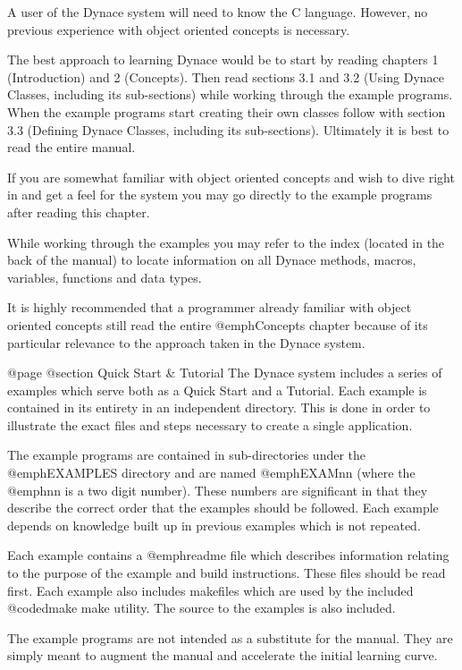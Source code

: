 A user of the Dynace system will need to know the C language.  However,
no previous experience with object oriented concepts is necessary.

The best approach to learning Dynace would be to start by reading
chapters 1 (Introduction) and 2 (Concepts).  Then read sections 3.1 and
3.2 (Using Dynace Classes, including its sub-sections) while working
through the example programs.  When the example programs start creating
their own classes follow with section 3.3 (Defining Dynace Classes,
including its sub-sections).  Ultimately it is best to read the entire
manual.

If you are somewhat familiar with object oriented concepts and wish
to dive right in and get a feel for the system you may go directly
to the example programs after reading this chapter.

While working through the examples you may refer to the index (located
in the back of the manual) to locate information on all Dynace methods,
macros, variables, functions and data types.


It is highly recommended that a programmer already familiar with object
oriented concepts still read the entire @emph{Concepts} chapter because
of its particular relevance to the approach taken in the Dynace system.







@page
@section Quick Start & Tutorial
The Dynace system includes a series of examples which serve both as a
Quick Start and a Tutorial.  Each example is contained in its entirety
in an independent directory.  This is done in order to illustrate the
exact files and steps necessary to create a single application.

The example programs are contained in sub-directories under the
@emph{EXAMPLES} directory and are named @emph{EXAMnn} (where the
@emph{nn} is a two digit number).  These numbers are significant in that
they describe the correct order that the examples should be followed.
Each example depends on knowledge built up in previous examples which is
not repeated.

Each example contains a @emph{readme} file which describes information
relating to the purpose of the example and build instructions.  These
files should be read first.  Each example also includes makefiles
which are used by the included @code{dmake} make utility.
The source to the examples is also included.

The example programs are not intended as a substitute for the manual.
They are simply meant to augment the manual and accelerate the initial
learning curve.

